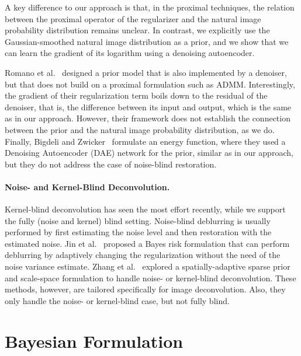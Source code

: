 \documentclass{article}
\begin{document}
A key difference to our approach is that, in the proximal techniques, the relation between the proximal operator of the regularizer and the natural image probability distribution remains unclear. In contrast, we explicitly use the Gaussian-smoothed natural image distribution as a prior, and we show that we can learn the gradient of its logarithm using a denoising autoencoder.

Romano et al.~\cite{romano2016little} designed a prior model that is also implemented by a denoiser, but that does not build on a proximal formulation such as ADMM. Interestingly, the gradient of their regularization term boils down to the residual of the denoiser, that is, the difference between its input and output, which is the same as in our approach. However, their framework does not establish the connection between the prior and the natural image probability distribution, as we do. Finally, Bigdeli and Zwicker~\cite{bigdeli2017image} formulate an energy function, where they used a Denoising Autoencoder (DAE) network for the prior, similar as in our approach, but they do not address the case of noise-blind restoration.


\paragraph{Noise- and Kernel-Blind Deconvolution.}
Kernel-blind deconvolution has seen the most effort recently, while we support the fully (noise and kernel) blind setting.
Noise-blind deblurring is usually performed by first estimating the noise level and then restoration with the estimated noise.
Jin et al.~\cite{Jin:2017:NBD} proposed a Bayes risk formulation that can perform deblurring by adaptively changing the regularization without the need of the noise variance estimate.
Zhang et al.~\cite{NIPS2013_4864, NIPS2014_5566} explored a spatially-adaptive sparse prior and scale-space formulation to handle noise- or kernel-blind deconvolution.
These methods, however, are tailored specifically for image deconvolution. Also, they only handle the noise- or kernel-blind case, but not fully blind.

\section{Bayesian Formulation}
\end{document}
